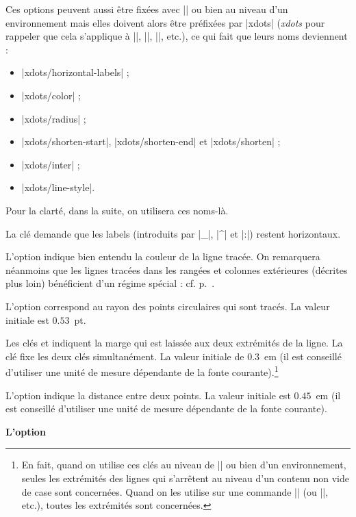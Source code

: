 \documentclass[dvipsnames]{article}%
\begin{document}
Ces options peuvent aussi être fixées avec |\NiceMatrixOptions| ou bien au
niveau d'un environnement mais elles doivent alors être préfixées par |xdots|
(\textsl{xdots} pour rappeler que cela s'applique à |\Cdots|, |\Ldots|,
|\Vdots|, etc.), ce qui fait que leurs noms deviennent :
%
\begin{itemize}
\item |xdots/horizontal-labels| ;
\item |xdots/color| ;
\item |xdots/radius| ;
\item |xdots/shorten-start|, |xdots/shorten-end| et |xdots/shorten| ;
\item |xdots/inter| ; 
\item |xdots/line-style|.
\end{itemize}
%
Pour la clarté, dans la suite, on utilisera ces noms-là.

\bigskip
La clé  demande que les labels (introduits
par |_|, |^| et |:|) restent horizontaux.

\medskip
L'option  indique bien entendu la couleur de la ligne
tracée. On remarquera néanmoins que les lignes tracées dans les rangées et
colonnes extérieures (décrites plus loin) bénéficient d'un régime spécial : cf.
p.~\pageref{exterior}.

\medskip
L'option  correspond au rayon des points circulaires qui sont
tracés. La valeur initiale est $0.53$~pt.

\medskip
Les clés  et 
indiquent la marge qui est laissée aux deux extrémités de la ligne. La clé
 fixe les deux clés simultanément. La valeur initiale
de $0.3$~em (il est conseillé d'utiliser une unité de mesure dépendante de la
fonte courante).\footnote{En fait, quand on utilise ces clés au niveau de
  |\NiceMatrixOptions| ou bien d'un environnement, seules les extrémités des
  lignes qui s'arrêtent au niveau d'un contenu non vide de case sont concernées.
  Quand on les utilise sur une commande |\Cdots| (ou |\Vdots|, etc.), toutes les 
  extrémités sont concernées.}

\medskip
L'option  indique la distance entre deux points. La
valeur initiale est $0.45$~em (il est conseillé d'utiliser une unité de mesure
dépendante de la fonte courante).

\medskip
\textbf{L'option }\par\nobreak
\end{document}
